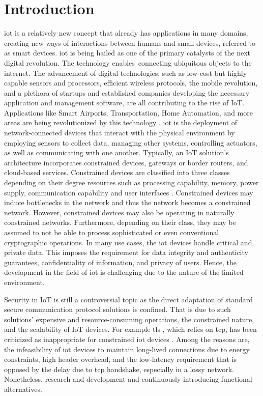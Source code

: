 \chapter{Introduction}
\label{ch:introduction}

\gls{iot} is a relatively new concept that already has applications in many domains, creating new ways of interactions between humans and small devices, referred to as smart devices. \gls{iot} is being hailed as one of the primary catalysts of the next digital revolution. The technology enables connecting ubiquitous objects to the internet. The advancement of digital technologies, such as low-cost but highly capable sensors and processors, efficient wireless protocols, the mobile revolution, and a plethora of startups and established companies developing the necessary application and management software, are all contributing to the rise of IoT.
Applications like Smart Airports, Transportation, Home Automation, and more areas are being revolutionized by this technology \cite{marksteiner2017overview}.
\gls{iot} is the deployment of network-connected devices that interact with the physical environment by employing sensors to collect data, managing other systems, controlling actuators, as well as communicating with one another. Typically, an IoT solution's architecture incorporates constrained devices, gateways or border routers, and cloud-based services. Constrained devices are classified into three classes depending on their degree resources such as processing capability, memory, power supply, communication capability and user interfaces \cite{rfc7228}. Constrained devices may induce bottlenecks in the network and thus the network becomes a constrained network. However, constrained devices may also be operating in naturally constrained networks. Furthermore, depending on their class, they may be assumed to not be able to process sophisticated or even conventional cryptographic operations. In many use cases, the \gls{iot} devices handle critical and private data. This imposes the requirement for data integrity and authenticity guarantees, confidentiality of information, and privacy of users. Hence, the development in the field of \gls{iot} is challenging due to the nature of the limited environment.
\par
Security in IoT is still a controversial topic as the direct adaptation of standard secure communication protocol solutions is confined. That is due to such solutions' expensive and resource-consuming operations, the constrained nature, and the scalability of IoT devices. For example \gls{tls} \cite{rfc5246}, which relies on \gls{tcp}, has been criticized as inappropriate for constrained \gls{iot} devices \cite{shang2016challenges}. Among the reasons are, the infeasibility of \gls{iot} devices to maintain long-lived connections due to energy constraints, high header overhead, and the low-latency requirement that is opposed by the delay due to \gls{tcp} handshake, especially in a lossy network. Nonetheless, research and development and continuously introducing functional alternatives. 
